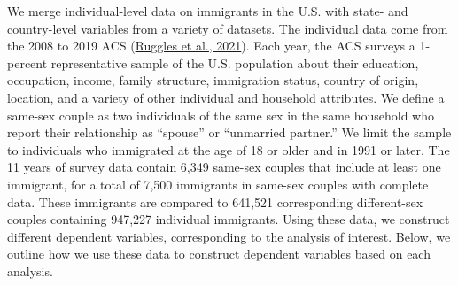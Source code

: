 \documentclass[
  11pt,
]{article}
\begin{document}
We merge individual-level data on immigrants in the U.S. with state- and country-level variables from a variety of datasets. The individual data come from the 2008 to 2019 ACS (\protect\hyperlink{ref-ruggles_2021}{Ruggles et al., 2021}). Each year, the ACS surveys a 1-percent representative sample of the U.S. population about their education, occupation, income, family structure, immigration status, country of origin, location, and a variety of other individual and household attributes. We define a same-sex couple as two individuals of the same sex in the same household who report their relationship as ``spouse'' or ``unmarried partner.'' We limit the sample to individuals who immigrated at the age of 18 or older and in 1991 or later. The 11 years of survey data contain 6,349 same-sex couples that include at least one immigrant, for a total of 7,500 immigrants in same-sex couples with complete data. These immigrants are compared to 641,521 corresponding different-sex couples containing 947,227 individual immigrants. Using these data, we construct different dependent variables, corresponding to the analysis of interest. Below, we outline how we use these data to construct dependent variables based on each analysis.
\end{document}
